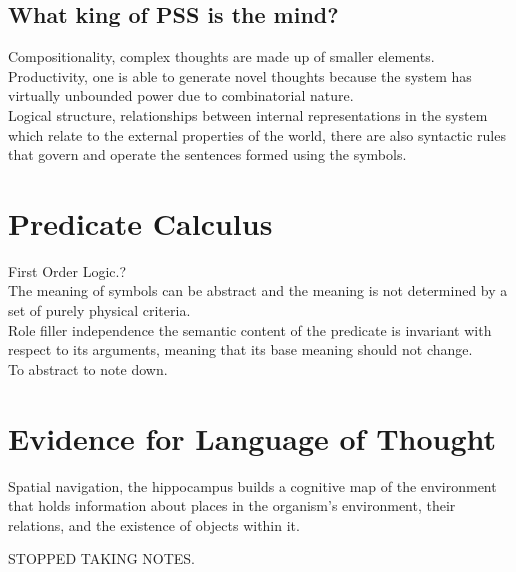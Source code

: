 \documentclass[11pt]{article}
\begin{document}
	\subsection{What king of PSS is the mind?}
	Compositionality, complex thoughts are made up of smaller elements.\\
	Productivity, one is able to generate novel thoughts because the system has virtually unbounded power due to combinatorial nature.\\
	Logical structure, relationships between internal representations in the system which relate to the external properties of the world, there are also syntactic rules that govern and operate the sentences formed using the symbols.\\
	
	\newpage
	\section{Predicate Calculus}
	First Order Logic.?\\
	The meaning of symbols can be abstract and the meaning is not determined by a set of purely physical criteria.\\
	Role filler independence the semantic content of the predicate is invariant with respect to its arguments, meaning that its base meaning should not change.\\
	To abstract to note down.
	
	\section{Evidence for Language of Thought}
	Spatial navigation, the hippocampus builds a cognitive map of the environment that holds information about places in the organism's environment, their relations, and the existence of objects  within it.
	
	STOPPED TAKING NOTES.
\end{document}
